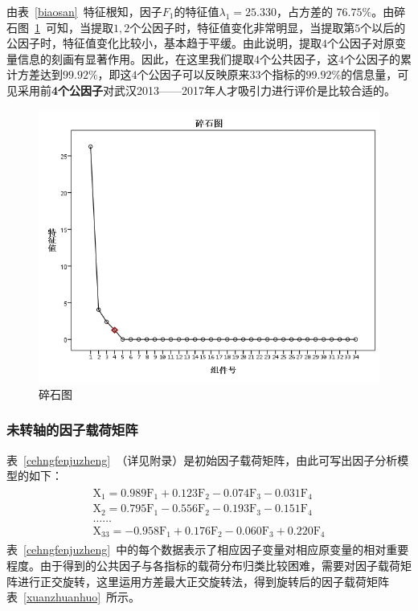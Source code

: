 \documentclass{whutmod}
\begin{document}
	
	由表~\ref{biaosan}~特征根知，因子$F_{1}$的特征值$\lambda_{1}=25.330$，占方差的 $76.75\%$。由碎石图~\ref{123}~可知，当提取$1,2$个公因子时，特征值变化非常明显，当提取第$5$个以后的公因子时，特征值变化比较小，基本趋于平缓。由此说明，提取$4$个公因子对原变量信息的刻画有显著作用。因此，在这里我们提取$4$个公共因子，这$4$个公因子的累计方差达到$99.92\%$，即这$4$个公因子可以反映原来$33$个指标的$99.92\%$的信息量，可见采用前\textbf{4个公因子}对武汉2013——2017年人才吸引力进行评价是比较合适的。
	
	\begin{figure}[H]
		\centering
		\includegraphics[width=\textwidth]{figures/123.png}
		\caption{碎石图}\label{123}
	\end{figure} 
	
	\subsubsection{未转轴的因子载荷矩阵}

	表~\ref{cehngfenjuzheng}~（详见附录）是初始因子载荷矩阵，由此可写出因子分析模型的如下：
	\begin{gather}
	\begin{array} { l } { \mathrm { X } _ { 1 } = 0.989 \mathrm { F } _ { 1 } + 0.123 \mathrm { F } _ { 2 } - 0.074 \mathrm { F } _ { 3 } - 0.031 \mathrm { F } _ { 4 } } \\ { \mathrm { X } _ { 2 } = 0.795 \mathrm { F } _ { 1 } - 0.556 \mathrm { F } _ { 2 } - 0.193 \mathrm { F } _ { 3 } - 0.151 \mathrm { F } _ { 4 } } \\ { \ldots \ldots } \\ { \mathrm { X } _ { 33 } = - 0.958 \mathrm { F } _ { 1 } + 0.176 \mathrm { F } _ { 2 } - 0.060 \mathrm { F } _ { 3 } + 0.220 \mathrm { F } _ { 4 } } \end{array}
	\end{gather}
		表~\ref{cehngfenjuzheng}~中的每个数据表示了相应因子变量对相应原变量的相对重要程度。由于得到的公共因子与各指标的载荷分布归类比较困难，需要对因子载荷矩阵进行正交旋转，这里运用方差最大正交旋转法\parencite{宋鸿2010城市人才吸引力的影响因素及提升对策}，得到旋转后的因子载荷矩阵表~\ref{xuanzhuanhuo}~所示。
		
\end{document}
